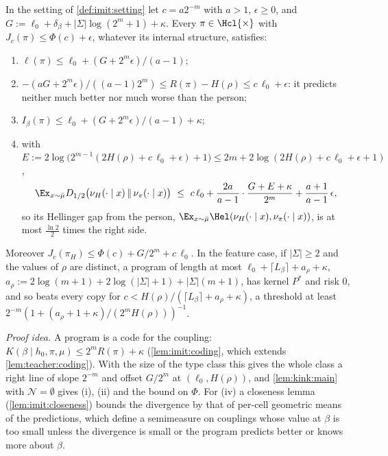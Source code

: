 \begin{theorem}\label{thm:imit:main}
In the setting of \cref{def:imit:setting} let $c=a2^{-m}$ with $a>1$, $\epsilon\ge0$, and $G:=\ell_0+\delta_\beta+|\Sigma|\log(2^m+1)+\kappa$. Every $\pi\in\Hcl{\times}$ with $J_c(\pi)\le\Phi(c)+\epsilon$, whatever its internal structure, satisfies:
\begin{enumerate}[label=(\roman*),itemsep=0pt,topsep=2pt]
\item $\ell(\pi)\le\ell_0+(G+2^m\epsilon)/(a-1)$;
\item $-(aG+2^m\epsilon)/((a-1)2^m)\le R(\pi)-H(\rho)\le c\,\ell_0+\epsilon$: it predicts neither much better nor much worse than the person;
\item $I_\beta(\pi)\le\ell_0+(G+2^m\epsilon)/(a-1)+\kappa$;
\item with $E:=2\log\big(2^{m-1}(2H(\rho)+c\,\ell_0+\epsilon)+1\big)\le2m+2\log(2H(\rho)+c\,\ell_0+\epsilon+1)$,
\[
\Ex_{x\sim\bar\mu}D_{1/2}\big(\nu_H(\cdot\mid x)\,\Vert\,\nu_\pi(\cdot\mid x)\big)\ \le\ c\,\ell_0+\frac{2a}{a-1}\cdot\frac{G+E+\kappa}{2^m}+\frac{a+1}{a-1}\,\epsilon,
\]
so its Hellinger gap from the person, $\Ex_{x\sim\bar\mu}\Hel(\nu_H(\cdot\mid x),\nu_\pi(\cdot\mid x))$, is at most $\frac{\ln2}2$ times the right side.
\end{enumerate}
Moreover $J_c(\pi_H)\le\Phi(c)+G/2^m+c\,\ell_0$. In the feature case, if $|\Sigma|\ge2$ and the values of $\rho$ are distinct, a program of length at most $\ell_0+\lceil L_\beta\rceil+a_\rho+\kappa$, $a_\rho:=2\log(m+1)+2\log(|\Sigma|+1)+|\Sigma|(m+1)$, has kernel $P^*$ and risk $0$, and so beats every copy for $c<H(\rho)/(\lceil L_\beta\rceil+a_\rho+\kappa)$, a threshold at least $2^{-m}(1+(a_\rho+1+\kappa)/(2^mH(\rho)))^{-1}$.
\end{theorem}

\emph{Proof idea.} A program is a code for the coupling: $K(\beta\mid h_0,\pi,\mu)\le2^mR(\pi)+\kappa$ (\cref{lem:imit:coding}, which extends \cref{lem:teacher:coding}). With the size of the type class this gives the whole class a right line of slope $2^{-m}$ and offset $G/2^m$ at $(\ell_0,H(\rho))$, and \cref{lem:kink:main} with $\mathcal N=\emptyset$ gives (i), (ii) and the bound on $\Phi$. For (iv) a closeness lemma (\cref{lem:imit:closeness}) bounds the divergence by that of per-cell geometric means of the predictions, which define a semimeasure on couplings whose value at $\beta$ is too small unless the divergence is small or the program predicts better or knows more about $\beta$.

